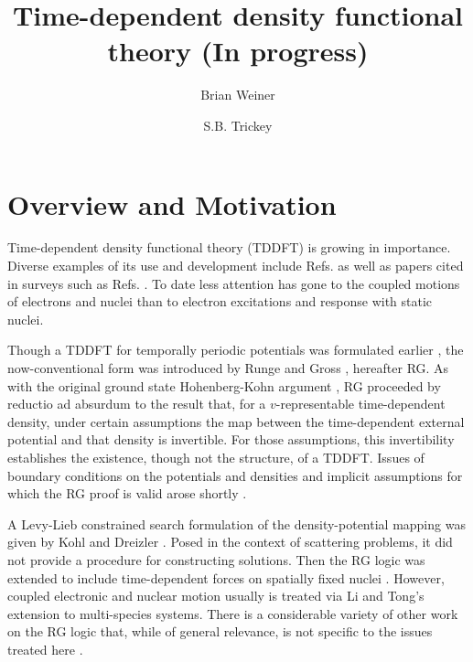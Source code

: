\documentclass[aps,preprint]{revtex4}%
\begin{document}
\title[TDDFT]{Time-dependent density functional theory (In progress)}
\author{Brian Weiner}
\author{S.B. Trickey}


\begin{abstract}


\end{abstract}
\maketitle
\tableofcontents


\section{Overview and Motivation}

\noindent Time-dependent density functional theory (TDDFT) is growing in
importance. Diverse examples of its use and development include Refs.
\cite{Teil92,Stener95,Saalmann96,Tong97,Serra97a,Ullrich97,AG97,Vignale97,Calvayrac98,Reinhard98,Ullrich98,Telnov98,Tong98,Campillo99,Vasiliev99,Knospe99,Hessler}
as well as papers cited in surveys such as Refs. .
To date less attention has gone to the coupled motions of electrons and nuclei
than to electron excitations and response with static nuclei.

Though a TDDFT for temporally periodic potentials was formulated earlier
\cite{Bartolotti81,DebGhosh82}, the now-conventional form was introduced by
Runge and Gross \cite{RG84}, hereafter RG. As with the original ground state
Hohenberg-Kohn argument \cite{HK}, RG proceeded by reductio ad absurdum to the
result that, for a $v$-representable time-dependent density, under certain
assumptions the map between the time-dependent external potential and that
density is invertible. For those assumptions, this invertibility establishes
the existence, though not the structure, of a TDDFT. Issues of boundary
conditions on the potentials and densities and implicit assumptions for which
the RG proof is valid arose shortly \cite{Xu85,Dhara87}.

A Levy-Lieb constrained search \cite{Levy79,LevyPerdew85,Lieb} formulation of
the density-potential mapping was given by Kohl and Dreizler \cite{KD86}.
Posed in the context of scattering problems, it did not provide a procedure
for constructing solutions. Then the RG logic was extended to include
time-dependent forces on spatially fixed nuclei \cite{KD86,Raj94A,RajBuot94B}.
However, coupled electronic and nuclear motion usually is treated via Li and
Tong's extension \cite{LiTong86} to multi-species systems. There is a
considerable variety of other work on the RG logic that, while of general
relevance, is not specific to the issues treated here \cite{Qian98,Chermyak00}.
\end{document}

